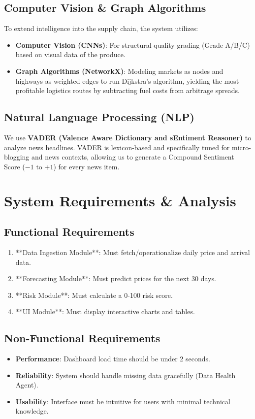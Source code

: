 \documentclass[a4paper,12pt]{report}
\begin{document}
\section{Computer Vision \& Graph Algorithms}
To extend intelligence into the supply chain, the system utilizes:
\begin{itemize}
    \item \textbf{Computer Vision (CNNs)}: For structural quality grading (Grade A/B/C) based on visual data of the produce.
    \item \textbf{Graph Algorithms (NetworkX)}: Modeling markets as nodes and highways as weighted edges to run Dijkstra's algorithm, yielding the most profitable logistics routes by subtracting fuel costs from arbitrage spreads.
\end{itemize}

\section{Natural Language Processing (NLP)}
We use \textbf{VADER (Valence Aware Dictionary and sEntiment Reasoner)} to analyze news headlines. VADER is lexicon-based and specifically tuned for micro-blogging and news contexts, allowing us to generate a Compound Sentiment Score ($-1$ to $+1$) for every news item.

\chapter{System Requirements \& Analysis}

\section{Functional Requirements}
\begin{enumerate}
    \item **Data Ingestion Module**: Must fetch/operationalize daily price and arrival data.
    \item **Forecasting Module**: Must predict prices for the next 30 days.
    \item **Risk Module**: Must calculate a 0-100 risk score.
    \item **UI Module**: Must display interactive charts and tables.
\end{enumerate}

\section{Non-Functional Requirements}
\begin{itemize}
    \item \textbf{Performance}: Dashboard load time should be under 2 seconds.
    \item \textbf{Reliability}: System should handle missing data gracefully (Data Health Agent).
    \item \textbf{Usability}: Interface must be intuitive for users with minimal technical knowledge.
\end{itemize}
\end{document}

